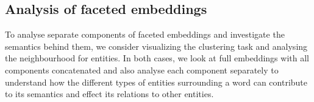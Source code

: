 \subsection{Analysis of faceted embeddings}\label{subsec:exp_faceted}
To analyse separate components of faceted embeddings and investigate the semantics behind them, we consider visualizing the clustering task and analysing the neighbourhood for entities. In both cases, we look at full embeddings with all components concatenated and also analyse each component separately to understand how the different types of entities surrounding a word can contribute to its semantics and effect its relations to other entities.
\begin{figure}[t]
\centering
{}

\end{figure}
